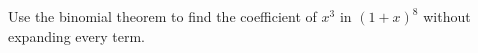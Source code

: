 Use the binomial theorem to find the coefficient of $x^3$ in $(1+x)^8$ without expanding every term.
